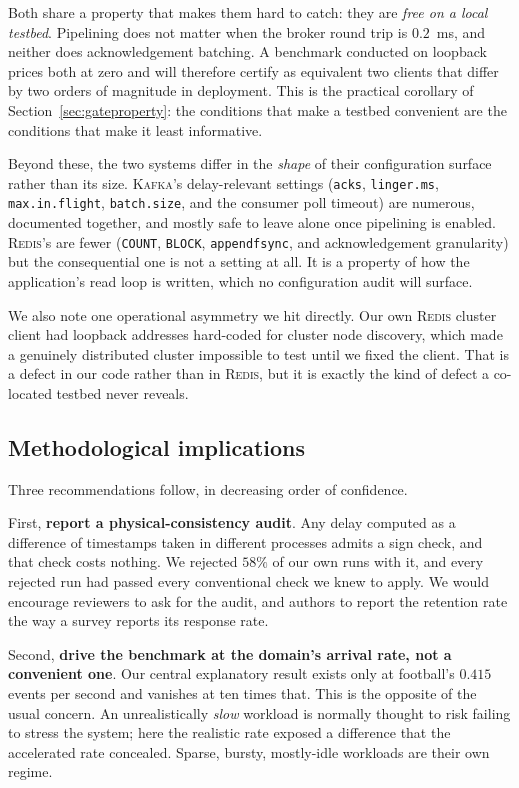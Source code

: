 \documentclass[Afour,sageh,times]{sagej}
\newcommand{\redis}{\textsc{Redis}}
\newcommand{\kafka}{\textsc{Kafka}}
\begin{document}
Both share a property that makes them hard to catch: they are \emph{free on a local testbed}.
Pipelining does not matter when the broker round trip is $0.2$~ms, and neither does
acknowledgement batching. A benchmark conducted on loopback prices both at zero and will therefore
certify as equivalent two clients that differ by two orders of magnitude in deployment. This is
the practical corollary of Section~\ref{sec:gateproperty}: the conditions that make a testbed
convenient are the conditions that make it least informative.

Beyond these, the two systems differ in the \emph{shape} of their configuration surface rather
than its size. \kafka{}'s delay-relevant settings (\texttt{acks}, \texttt{linger.ms},
\texttt{max.in.flight}, \texttt{batch.size}, and the consumer poll timeout) are numerous,
documented together, and mostly safe to leave alone once pipelining is enabled. \redis{}'s are
fewer (\texttt{COUNT}, \texttt{BLOCK}, \texttt{appendfsync}, and acknowledgement granularity) but
the consequential one is not a setting at all. It is a property of how the application's read loop
is written, which no configuration audit will surface.

We also note one operational asymmetry we hit directly. Our own \redis{} cluster client had
loopback addresses hard-coded for cluster node discovery, which made a genuinely distributed
cluster impossible to test until we fixed the client. That is a defect in our code rather than in
\redis{}, but it is exactly the kind of defect a co-located testbed never reveals.

\subsection{Methodological implications}
\label{sec:methodimplications}

Three recommendations follow, in decreasing order of confidence.

First, \textbf{report a physical-consistency audit}. Any delay computed as a difference of
timestamps taken in different processes admits a sign check, and that check costs nothing. We
rejected $58\%$ of our own runs with it, and every rejected run had passed every conventional
check we knew to apply. We would encourage reviewers to ask for the audit, and authors to report
the retention rate the way a survey reports its response rate.

Second, \textbf{drive the benchmark at the domain's arrival rate, not a convenient one}. Our
central explanatory result exists only at football's $0.415$ events per second and vanishes at ten
times that. This is the opposite of the usual concern. An unrealistically \emph{slow} workload is
normally thought to risk failing to stress the system; here the realistic rate exposed a
difference that the accelerated rate concealed. Sparse, bursty, mostly-idle workloads are their
own regime.
\end{document}
